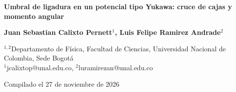 \documentclass[10pt,letterpaper]{article}
\begin{document}
\begin{flushleft}
{\sffamily\bfseries\LARGE Umbral de ligadura en un potencial tipo Yukawa: cruce de cajas y momento angular\par}
\vspace{6pt}
{\sffamily\bfseries Juan Sebastian Calixto Pernett$^{1}$, Luis Felipe Ramirez Andrade$^{2}$\par}
\vspace{2pt}
{\sffamily\footnotesize $^{1,2}$Departamento de Física, Facultad de Ciencias, Universidad Nacional de Colombia, Sede Bogotá\\
$^{1}$jcalixtop@unal.edu.co, $^{2}$luramirezan@unal.edu.co\par}
\vspace{4pt}
{\sffamily\footnotesize Compilado el 27 de noviembre de 2026\par}
\end{flushleft}
\vspace{-2pt}
\end{document}
